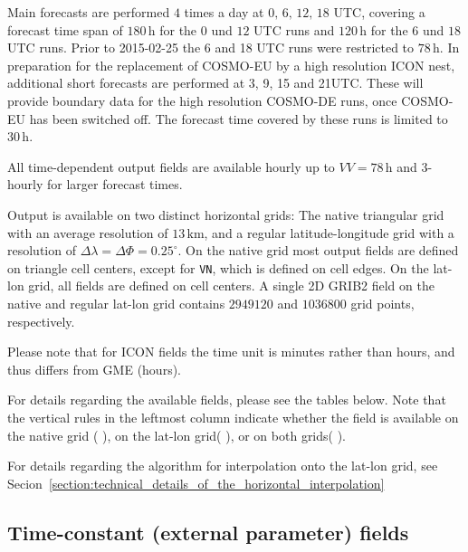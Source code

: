 Main forecasts are performed $4$ times a day at $0,\, 6,\, 12,\, 18$ UTC, covering a forecast time span of $180\,\mathrm{h}$ for the 
$0$ und $12$ UTC runs and $120\,\mathrm{h}$ for the $6$ und $18$ UTC runs. Prior to 2015-02-25 the 6 and 18 UTC runs were restricted 
to $78\,\mathrm{h}$. In preparation for the replacement of COSMO-EU by a high resolution ICON nest, additional short forecasts are 
performed at 3, 9, 15 and 21UTC. These will provide boundary data for the high resolution COSMO-DE runs, once COSMO-EU has been switched off. 
The forecast time covered by these runs is limited to $30\,\mathrm{h}$. 

All time-dependent output fields are available hourly up to $VV=78\,\mathrm{h}$ and 3-hourly for larger forecast times\footnotemark[2].

Output is available on two distinct horizontal grids: The native triangular grid with an average resolution of $13\,\mathrm{km}$, 
and a regular latitude-longitude grid with a resolution of $\Delta \lambda = \Delta \Phi=0.25^{\circ}$. On the native grid most output 
fields are defined on triangle cell centers, except for \texttt{VN}, which is defined on cell edges. On the lat-lon grid, all fields are 
defined on cell centers. A single 2D GRIB2 field on the native and regular lat-lon grid contains $2949120$ and $1036800$ grid points, respectively.

Please note that for ICON fields the time unit is minutes rather than hours, and thus differs from GME (hours). 

For details regarding the available fields, please see the tables below. Note that the vertical rules in the leftmost column indicate whether the field is 
available on the native grid ($\,$\markRed$\,$), on the lat-lon grid($\,$\markBlue$\,$), or on both grids($\,$\markRed\markBlue$\,$). 

For details regarding the algorithm for interpolation onto the lat-lon grid, see Secion~\ref{section:technical_details_of_the_horizontal_interpolation}



\subsection{Time-constant (external parameter) fields}


